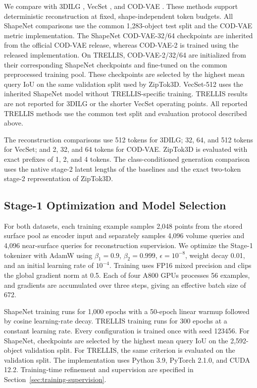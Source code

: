 We compare with 3DILG \citep{zhang20223dilg}, VecSet
\citep{zhang20233dshape2vecset}, and COD-VAE
\citep{cho2025representing}.  These methods support deterministic
reconstruction at fixed, shape-independent token budgets.  All ShapeNet
comparisons use the common 1,283-object test split and the COD-VAE
metric implementation. The ShapeNet COD-VAE-32/64 checkpoints are inherited
from the official COD-VAE release, whereas COD-VAE-2 is trained using the
released implementation. On TRELLIS, COD-VAE-2/32/64 are initialized from
their corresponding ShapeNet checkpoints and fine-tuned on the common
preprocessed training pool. These checkpoints are selected by the highest mean
query IoU on the same validation split used by ZipTok3D.
VecSet-512 uses the inherited ShapeNet model without TRELLIS-specific training.
TRELLIS results are not reported for 3DILG or the shorter VecSet operating
points. All reported TRELLIS methods use the common test split and
evaluation protocol described above.

The reconstruction comparisons use 512 tokens for 3DILG; 32, 64, and 512
tokens for VecSet; and 2, 32, and 64 tokens for COD-VAE.  ZipTok3D is evaluated
with exact prefixes of 1, 2, and 4 tokens.  The class-conditioned generation
comparison uses the native stage-2 latent lengths of the baselines and the
exact two-token stage-2 representation of ZipTok3D.

\subsection{Stage-1 Optimization and Model Selection}
\label{sec:optimization}

For both datasets, each training example samples 2,048 points from the stored
surface pool as encoder input and separately samples 4,096 volume queries and
4,096 near-surface queries for reconstruction supervision. We optimize the
Stage-1 tokenizer with AdamW using $\beta_1=0.9$, $\beta_2=0.999$,
$\epsilon=10^{-8}$, weight decay 0.01, and an initial learning rate of
$10^{-4}$. Training uses FP16 mixed precision and clips the global gradient
norm at 0.5. Each of four A800 GPUs processes 56 examples, and gradients are
accumulated over three steps, giving an effective batch size of 672.

ShapeNet training runs for 1,000 epochs with a 50-epoch linear warmup followed
by cosine learning-rate decay. TRELLIS training runs for 300 epochs at a
constant learning rate. Every configuration is trained once with seed 123456.
For ShapeNet, checkpoints are selected by the highest mean query IoU on the
2,592-object validation split. For TRELLIS, the same criterion is evaluated on
the validation split. The implementation
uses Python 3.9, PyTorch 2.1.0, and CUDA 12.2. Training-time refinement and
supervision are specified in Section~\ref{sec:training-supervision}.

